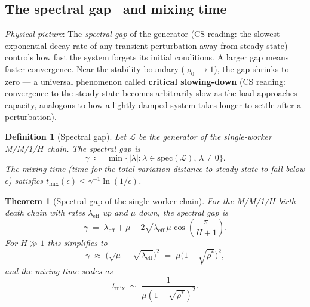 \documentclass[11pt,a4paper]{report}
\newtheorem{theorem}{Theorem}[section]
\newtheorem{definition}{Definition}[section]
\newcommand{\abs}[1]{\left\lvert #1 \right\rvert}
\newcommand{\rhostar}{\rho^{*}}
\newcommand{\rhozero}{\varrho_0}
\newcommand{\generator}{\mathcal{L}}
\begin{document}
\subsection{The spectral gap~\cite{diaconis_stroock1991,fill1991} and mixing time}

\emph{Physical picture}:
The \emph{spectral gap} of the generator
(CS reading: the slowest exponential decay rate of any transient
perturbation away from steady state)
controls how fast the system forgets its initial conditions.
A larger gap means faster convergence.
Near the stability boundary ($\rhozero \to 1$), the gap shrinks to zero
--- a universal phenomenon called \textbf{critical slowing-down}
(CS reading: convergence to the steady state becomes arbitrarily slow
as the load approaches capacity, analogous to how a lightly-damped
system takes longer to settle after a perturbation).

\begin{definition}[Spectral gap]
\label{def:gap}
Let $\generator$ be the generator of the single-worker M/M/1/$H$ chain.
The \emph{spectral gap} is
\begin{equation}
  \gamma \;\coloneqq\; \min\{\abs{\lambda} : \lambda \in \mathrm{spec}(\generator),\, \lambda \neq 0\}.
  \label{eq:gap}
\end{equation}
The \emph{mixing time} (time for the total-variation distance to steady state
to fall below $\epsilon$) satisfies $t_{\mathrm{mix}}(\epsilon) \leq \gamma^{-1}\ln(1/\epsilon)$.
\end{definition}

\begin{theorem}[Spectral gap of the single-worker chain]
\label{thm:gap}
For the M/M/1/$H$ birth-death chain with rates $\lambda_{\mathrm{eff}}$ up
and $\mu$ down, the spectral gap is
\begin{equation}
  \gamma
  \;=\; \lambda_{\mathrm{eff}} + \mu
        - 2\sqrt{\lambda_{\mathrm{eff}}\,\mu}\cos\!\left(\frac{\pi}{H+1}\right).
  \label{eq:gap-exact}
\end{equation}
For $H \gg 1$ this simplifies to
\begin{equation}
  \gamma \;\approx\; \bigl(\sqrt{\mu} - \sqrt{\lambda_{\mathrm{eff}}}\bigr)^2
          \;=\; \mu\bigl(1 - \sqrt{\rhostar}\bigr)^2,
  \label{eq:gap-approx}
\end{equation}
and the mixing time scales as
\begin{equation}
  t_{\mathrm{mix}} \;\sim\; \frac{1}{\mu(1-\sqrt{\rhostar})^2}.
  \label{eq:tmix}
\end{equation}
\end{theorem}
\end{document}
